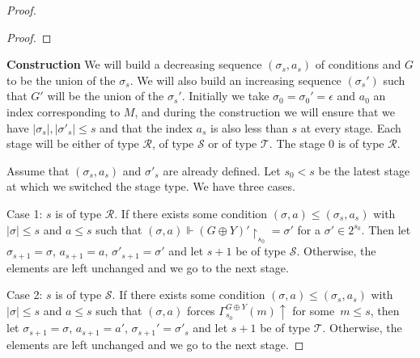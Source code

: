 \documentclass{article}
\numberwithin{theorem}{section}
\newcommand{\WF}{\mathsf{WF}}
\newcommand{\M}{\mathcal{M}}
\newcommand{\uh}[0]{{\upharpoonright}}
\begin{document}
\begin{proof}
\begin{proof}



  

\end{proof}

\textbf{Construction} We will build a decreasing sequence $(\sigma_s,a_s)$ of conditions and $G$ to be the union of the $\sigma_s$. We will also build an increasing sequence $(\sigma_s')$ such that $G'$ will be the union of the $\sigma_s'$. Initially we take $\sigma_0 = \sigma_0' = \epsilon$ and $a_0$ an index corresponding to $M$, and during the construction we will ensure that we have $|\sigma_s|,|\sigma'_s| \leq s$ and that the index $a_s$ is also less than $s$ at every stage. Each stage will be either of type $\mathcal{R}$, of type $\mathcal{S}$ or of type $\mathcal{T}$. The stage $0$ is of type $\mathcal{R}$.

Assume that $(\sigma_s, a_s)$ and $\sigma'_s$ are already defined. Let $s_0 < s$ be the latest stage at which we switched the stage type. We have three cases.

Case 1: $s$ is of type $\mathcal{R}$. If there exists some condition $(\sigma,a) \leq (\sigma_s,a_s)$ with $|\sigma| \leq s$ and $a \leq s$ such that $(\sigma,a) \Vdash (G \oplus Y)' \uh_{s_0} = \sigma'$ for a $\sigma' \in 2^{s_0}$. Then let $\sigma_{s+1} = \sigma$, $a_{s+1} = a$, $\sigma'_{s+1} = \sigma'$ and let $s+1$ be of type $\mathcal{S}$. Otherwise, the elements are left unchanged and we go to the next stage.

Case 2: $s$ is of type $\mathcal{S}$. If there exists some condition $(\sigma,a) \leq (\sigma_s,a_s)$ with $|\sigma| \leq s$ and $a \leq s$ such that $(\sigma, a)$ forces $\Gamma_{s_0}^{G \oplus Y}(m)\uparrow$ for some~$m \leq s$, then let $\sigma_{s+1} = \sigma$, $a_{s+1} = a'$, $\sigma_{s+1}' = \sigma'_s$ and let $s+1$ be of type $\mathcal{T}$. Otherwise, the elements are left unchanged and we go to the next stage.


\end{proof}
\end{document}
